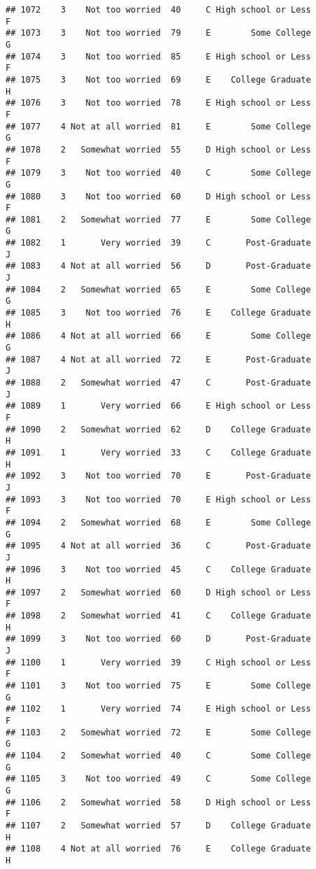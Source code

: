 \documentclass[
]{article}
\begin{document}
\begin{verbatim}
## 1072    3    Not too worried  40     C High school or Less         F
## 1073    3    Not too worried  79     E        Some College         G
## 1074    3    Not too worried  85     E High school or Less         F
## 1075    3    Not too worried  69     E    College Graduate         H
## 1076    3    Not too worried  78     E High school or Less         F
## 1077    4 Not at all worried  81     E        Some College         G
## 1078    2   Somewhat worried  55     D High school or Less         F
## 1079    3    Not too worried  40     C        Some College         G
## 1080    3    Not too worried  60     D High school or Less         F
## 1081    2   Somewhat worried  77     E        Some College         G
## 1082    1       Very worried  39     C       Post-Graduate         J
## 1083    4 Not at all worried  56     D       Post-Graduate         J
## 1084    2   Somewhat worried  65     E        Some College         G
## 1085    3    Not too worried  76     E    College Graduate         H
## 1086    4 Not at all worried  66     E        Some College         G
## 1087    4 Not at all worried  72     E       Post-Graduate         J
## 1088    2   Somewhat worried  47     C       Post-Graduate         J
## 1089    1       Very worried  66     E High school or Less         F
## 1090    2   Somewhat worried  62     D    College Graduate         H
## 1091    1       Very worried  33     C    College Graduate         H
## 1092    3    Not too worried  70     E       Post-Graduate         J
## 1093    3    Not too worried  70     E High school or Less         F
## 1094    2   Somewhat worried  68     E        Some College         G
## 1095    4 Not at all worried  36     C       Post-Graduate         J
## 1096    3    Not too worried  45     C    College Graduate         H
## 1097    2   Somewhat worried  60     D High school or Less         F
## 1098    2   Somewhat worried  41     C    College Graduate         H
## 1099    3    Not too worried  60     D       Post-Graduate         J
## 1100    1       Very worried  39     C High school or Less         F
## 1101    3    Not too worried  75     E        Some College         G
## 1102    1       Very worried  74     E High school or Less         F
## 1103    2   Somewhat worried  72     E        Some College         G
## 1104    2   Somewhat worried  40     C        Some College         G
## 1105    3    Not too worried  49     C        Some College         G
## 1106    2   Somewhat worried  58     D High school or Less         F
## 1107    2   Somewhat worried  57     D    College Graduate         H
## 1108    4 Not at all worried  76     E    College Graduate         H

\end{verbatim}
\end{document}
